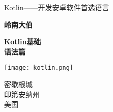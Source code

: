 \begin{titlepage}
    \begin{center}
        \vspace*{1cm}
 
        \vspace{0.5cm}
         Kotlin——开发安卓软件首选语言
             
        \vspace{1.5cm}
 
        \textbf{岭南大伯}
 
        \vfill
             
        {\fontsize{60}{60}\selectfont\textbf{ Kotlin基础\\
        语法篇}}
        \vfill
             
        \vspace{0.8cm}
      
        \texttt{[image: kotlin.png]}
             
        密歇根城\\
        印第安纳州\\
        美国\\
             
    \end{center}
 \end{titlepage}